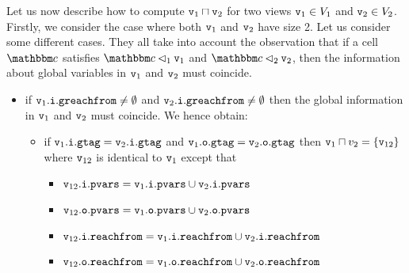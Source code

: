 Let us now describe how to compute  $\mathtt{v}_1 \sqcap \mathtt{v}_2$ for
two views $\mathtt{v}_1 \in V_1$ and $\mathtt{v}_2 \in V_2$.
Firstly, we consider the case where both $\mathtt{v}_1$ and $\mathtt{v}_2$ have size 2.
Let us consider some different cases.
They all take into account the  observation that if a cell $\cell$ satisfies
$\cell \satfrag{1} \frag_1$ and $\cell \satfrag{2} \frag_2$, then
the information about global variables in $\mathtt{v}_1$ and $\mathtt{v}_2$ must coincide.
 \begin{itemize}
 \item if $\mathtt{v}_1.\mathtt{i}.\mathtt{greachfrom} \neq \emptyset$ and $\mathtt{v}_2.\mathtt{i}.\mathtt{greachfrom} \neq \emptyset$ then the global information in $\mathtt{v}_1$ and $\mathtt{v}_2$ must coincide. We hence obtain:
  \begin{itemize}
  \item if $\mathtt{v}_1.\mathtt{i}.\mathtt{gtag} = \mathtt{v}_2.\mathtt{i}.\mathtt{gtag}$ and $\mathtt{v}_1.\mathtt{o}.\mathtt{gtag} = \mathtt{v}_2.\mathtt{o}.\mathtt{gtag}$ then $\mathtt{v}_1 \sqcap v_2 = \left\{\mathtt{v}_{12}\right\}$ where $\mathtt{v}_{12}$ is identical to $\mathtt{v}_1$ except that 
  \begin{itemize}
  \item $\mathtt{v}_{12}.\mathtt{i}.\mathtt{pvars} = \mathtt{v}_1.\mathtt{i}.\mathtt{pvars} \cup \mathtt{v}_2.\mathtt{i}.\mathtt{pvars}$ 
  \item  $\mathtt{v}_{12}.\mathtt{o}.\mathtt{pvars} = \mathtt{v}_1.\mathtt{o}.\mathtt{pvars} \cup \mathtt{v}_2.\mathtt{o}.\mathtt{pvars}$
  \item $\mathtt{v}_{12}.\mathtt{i}.\mathtt{reachfrom} = \mathtt{v}_{1}.\mathtt{i}.\mathtt{reachfrom} \cup \mathtt{v}_{2}.\mathtt{i}.\mathtt{reachfrom}$
   \item $\mathtt{v}_{12}.\mathtt{o}.\mathtt{reachfrom} = \mathtt{v}_{1}.\mathtt{o}.\mathtt{reachfrom} \cup \mathtt{v}_{2}.\mathtt{o}.\mathtt{reachfrom}$
    \end{itemize}
 \end{itemize}


\end{itemize}
